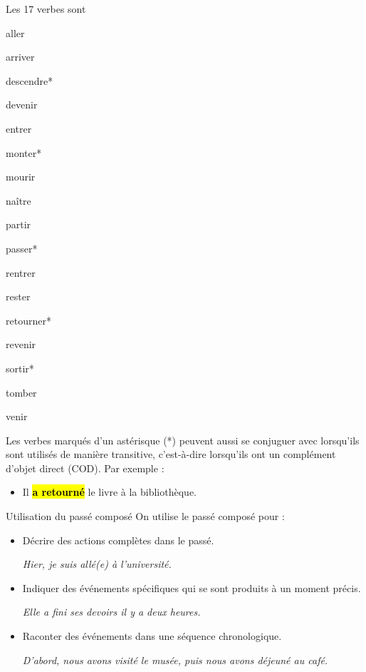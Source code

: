 Les 17 verbes sont
\begin{enumerate*}[label=(\arabic*)]
    \item aller \item arriver \item descendre* \item devenir \item entrer \item monter* \item mourir \item naître \item partir
    \item passer* \item rentrer \item rester \item retourner* \item revenir \item sortir* \item tomber \item venir
\end{enumerate*}

\begin{frwarn}
    Les verbes marqués d'un astérisque (*) peuvent aussi se conjuguer avec 
    lorsqu'ils sont utilisés de manière transitive, c'est-à-dire lorsqu'ils ont un complément
    d'objet direct (COD). Par exemple :
    \begin{itemize}
        \item Il \hl{\textbf{a retourné}} le livre à la bibliothèque.
    \end{itemize}
\end{frwarn}
\vspace*{-1.5em}
\begin{frbox}[violet]{Utilisation du passé composé}
    On utilise le passé composé pour :
    \begin{itemize}
        \item Décrire des actions complètes dans le passé.
        
        \qquad\textit{Hier, je suis allé(e) à l'université.}
        \item Indiquer des événements spécifiques qui se sont produits à un moment précis.
        
        \qquad\textit{Elle a fini ses devoirs il y a deux heures.}
        \item Raconter des événements dans une séquence chronologique.
        
        \qquad\textit{D'abord, nous avons visité le musée, puis nous avons déjeuné au café.}
    \end{itemize}
\end{frbox}

